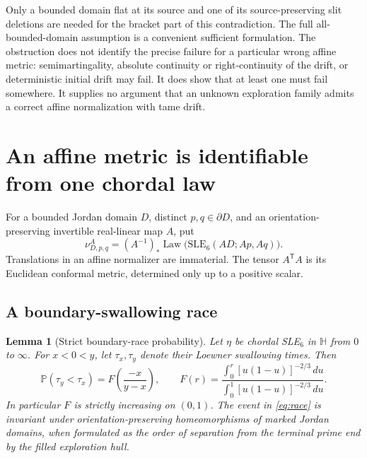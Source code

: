 \documentclass[11pt]{article}
\newtheorem{lemma}[theorem]{Lemma}
\theoremstyle{definition}\newtheorem{definition}[theorem]{Definition}
\theoremstyle{remark}\newtheorem{remark}[theorem]{Remark}
\newcommand{\SLE}{\mathrm{SLE}_6}
\newcommand{\HH}{\mathbb H}
\newcommand{\Law}{\operatorname{Law}}
\newcommand{\nuA}[4]{\nu^{#1}_{#2,#3,#4}}
\begin{document}
Only a bounded domain flat at its source and one of its source-preserving
slit deletions are needed for the bracket part of this contradiction.
The full all-bounded-domain assumption is a convenient sufficient
formulation.  The obstruction does not identify the precise failure for a
particular wrong affine metric: semimartingality, absolute continuity or
right-continuity of the drift, or deterministic initial drift may fail.
It does show that at least one must fail somewhere.  It supplies no argument
that an unknown exploration family admits a correct affine normalization
with tame drift.

\section{An affine metric is identifiable from one chordal law}
\label{sec:identifiability}

For a bounded Jordan domain $D$, distinct $p,q\in\partial D$, and an
orientation-preserving invertible real-linear map $A$, put
\begin{equation}
 \nuA{A}{D}{p}{q}
 = (A^{-1})_*\Law\bigl(\SLE(AD;Ap,Aq)\bigr).
 \label{eq:affine-law}
\end{equation}
Translations in an affine normalizer are immaterial. The tensor
$A^{\mathsf T}A$ is its Euclidean conformal metric, determined only up to a
positive scalar.

\subsection{A boundary-swallowing race}

\begin{lemma}[Strict boundary-race probability]
\label{lem:race}
Let $\eta$ be chordal SLE$_6$ in $\HH$ from $0$ to $\infty$. For
$x<0<y$, let $\tau_x,\tau_y$ denote their Loewner swallowing times. Then
\begin{equation}
 \mathbb P(\tau_y<\tau_x)=F\left(\frac{-x}{y-x}\right),\qquad
 F(r)=\frac{\int_0^r[u(1-u)]^{-2/3}\,du}
 {\int_0^1[u(1-u)]^{-2/3}\,du}.
 \label{eq:race}
\end{equation}
In particular $F$ is strictly increasing on $(0,1)$. The event in
\eqref{eq:race} is invariant under orientation-preserving homeomorphisms of
marked Jordan domains, when formulated as the order of separation from
the terminal prime end by the filled exploration hull.
\end{lemma}
\end{document}
